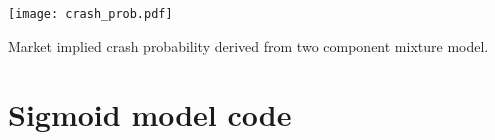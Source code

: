 \documentclass[a4paper]{tufte-handout}
\begin{document}
\begin{marginfigure}
  \begin{center}
    \texttt{[image: crash\_prob.pdf]}
  \end{center}
  \caption{Market implied crash probability derived from two component
    mixture model.}
\end{marginfigure}

\appendix

\section{Sigmoid model code}
\label{app:model}

\end{document}
